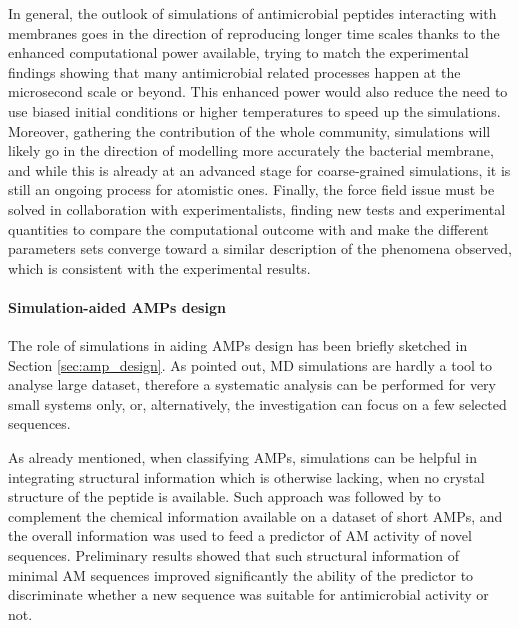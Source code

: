 In general, the outlook of simulations of antimicrobial peptides interacting with membranes goes in the direction of reproducing longer time scales thanks to the enhanced computational power available, trying to match the experimental findings showing that many antimicrobial related processes happen at the microsecond scale or beyond.
%
This enhanced power would also reduce the need to use biased initial conditions or higher temperatures to speed up the simulations.
%
Moreover, gathering the contribution of the whole community, simulations will likely go in the direction of modelling more accurately the bacterial membrane, and while this is already at an advanced stage for coarse-grained simulations, it is still an ongoing process for atomistic ones.
%
Finally, the force field issue must be solved in collaboration with experimentalists, finding new tests and experimental quantities to compare the computational outcome with and make the different parameters sets converge toward a similar description of the phenomena observed, which is consistent with the experimental results.


\paragraph{Simulation-aided AMPs design} \label{sec:design_md_examples}

The role of simulations in aiding AMPs design has been briefly sketched in Section \ref{sec:amp_design}. As pointed out, MD simulations are hardly a tool to analyse large dataset, therefore a systematic analysis can be performed for very small systems only, or, alternatively, the investigation can focus on a few selected sequences.

As already mentioned, when classifying AMPs, simulations can be helpful in integrating structural information which is otherwise lacking, when no crystal structure of the peptide is available. Such approach was followed by \citet{Liu2018} to complement the chemical information available on a dataset of short AMPs, and the overall information was used to feed a predictor of AM activity of novel sequences. Preliminary results showed that such structural information of minimal AM sequences improved significantly the ability of the predictor to discriminate whether a new sequence was suitable for antimicrobial activity or not.

